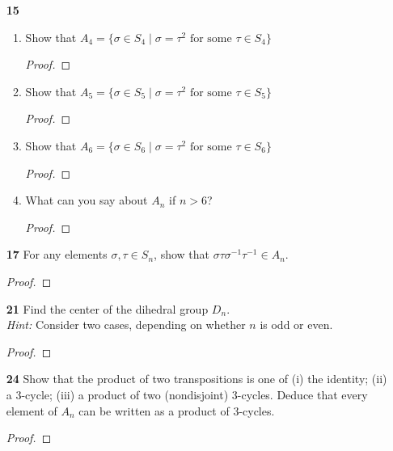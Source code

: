 \documentclass[paper=usletter, fontsize=12pt]{article}
\begin{document}
\begin{itemize}
\begin{itemize}
            \item[\textbf{15}]
            \begin{enumerate}[label=\textbf{(\alph*)}]

                \item Show that $A_4=\{\sigma \in S_4 \mid \sigma = \tau^2
                \text{ for some } \tau \in S_4\}$
                \begin{proof}
                \end{proof}

                \item Show that $A_5=\{\sigma \in S_5 \mid \sigma = \tau^2
                \text{ for some } \tau \in S_5\}$
                \begin{proof}
                \end{proof}

                \item Show that $A_6=\{\sigma \in S_6 \mid \sigma = \tau^2
                \text{ for some } \tau \in S_6\}$
                \begin{proof}
                \end{proof}

                \item What can you say about $A_n$ if $n>6$?
                \begin{proof}
                \end{proof}

            \end{enumerate}

            \item[\textbf{17}] For any elements $\sigma, \tau \in S_n$, show
            that $\sigma\tau\sigma^{-1}\tau^{-1}\in A_n$.
            \begin{proof}
            \end{proof}

            \item[\textbf{21}] Find the center of the dihedral group $D_n$. \\
            \textit{Hint:} Consider two cases, depending on whether $n$ is odd
            or even.
            \begin{proof}
            \end{proof}

            \item[\textbf{24}] Show that the product of two transpositions is
            one of (i) the identity; (ii) a 3-cycle; (iii) a product of two
            (nondisjoint) 3-cycles. Deduce that every element of $A_n$ can be
            written as a product of 3-cycles.
            \begin{proof}
            \end{proof}


\end{itemize}
\end{itemize}
\end{document}
